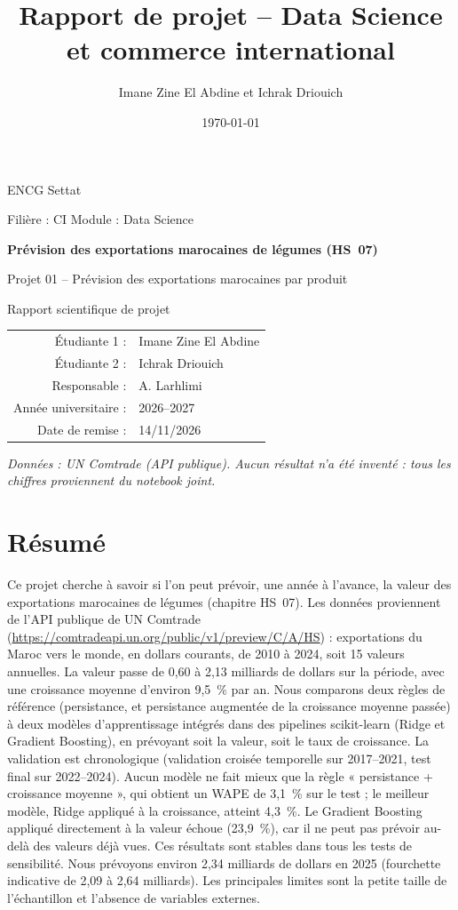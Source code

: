 \documentclass[11pt,a4paper]{article}
\title{\textbf{Rapport de projet -- Data Science et commerce international}}
\author{Imane Zine El Abdine et Ichrak Driouich}
\date{\today}
\begin{document}
\begin{titlepage}
\centering
{\Large ENCG Settat \par}
\vspace{1cm}
{\large Filière : CI \quad Module : Data Science\par}
\vspace{1.8cm}
{\Huge\bfseries Prévision des exportations marocaines de légumes (HS~07)\par}
\vspace{0.6cm}
{\Large Projet 01 -- Prévision des exportations marocaines par produit\par}
\vspace{1.5cm}
{\Large Rapport scientifique de projet\par}
\vspace{1.5cm}
\begin{tabular}{rl}
Étudiante 1 : & Imane Zine El Abdine \\
Étudiante 2 : & Ichrak Driouich \\
Responsable : & A. Larhlimi \\
Année universitaire : & 2026--2027 \\
Date de remise : & 14/11/2026 \\
\end{tabular}
\vfill
\textit{Données : UN Comtrade (API publique). Aucun résultat n'a été inventé : tous les chiffres proviennent du notebook joint.}
\end{titlepage}

\section*{Résumé}
Ce projet cherche à savoir si l'on peut prévoir, une année à l'avance, la valeur des exportations marocaines de légumes (chapitre HS~07). Les données proviennent de l'API publique de UN Comtrade (\url{https://comtradeapi.un.org/public/v1/preview/C/A/HS}) : exportations du Maroc vers le monde, en dollars courants, de 2010 à 2024, soit 15 valeurs annuelles. La valeur passe de 0,60 à 2,13 milliards de dollars sur la période, avec une croissance moyenne d'environ 9,5~\% par an. Nous comparons deux règles de référence (persistance, et persistance augmentée de la croissance moyenne passée) à deux modèles d'apprentissage intégrés dans des pipelines scikit-learn (Ridge et Gradient Boosting), en prévoyant soit la valeur, soit le taux de croissance. La validation est chronologique (validation croisée temporelle sur 2017--2021, test final sur 2022--2024). Aucun modèle ne fait mieux que la règle « persistance + croissance moyenne », qui obtient un WAPE de 3,1~\% sur le test ; le meilleur modèle, Ridge appliqué à la croissance, atteint 4,3~\%. Le Gradient Boosting appliqué directement à la valeur échoue (23,9~\%), car il ne peut pas prévoir au-delà des valeurs déjà vues. Ces résultats sont stables dans tous les tests de sensibilité. Nous prévoyons environ 2,34 milliards de dollars en 2025 (fourchette indicative de 2,09 à 2,64 milliards). Les principales limites sont la petite taille de l'échantillon et l'absence de variables externes.
\end{document}
